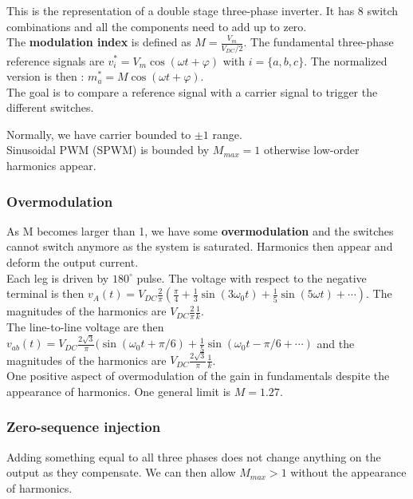 \documentclass[../main.tex]{subfiles}
\begin{document}
This is the representation of a double stage three-phase inverter. It has 8 switch combinations and all the components need to add up to zero.\\

The \textbf{modulation index} is defined as $M = \frac{V_m}{V_{DC}/2}$. The fundamental three-phase reference signals are $v_i^* = V_m \cos(\omega t + \varphi)$ with $i = \{a,b,c\}$. The normalized version is then : $m_a^* = M\cos(\omega t + \varphi)$.\\

The goal is to compare a reference signal with a carrier signal to trigger the different switches. 

Normally, we have carrier bounded to $\pm 1$ range. \\
Sinusoidal PWM (SPWM) is bounded by $M_{max} = 1$ otherwise low-order harmonics appear.\\

\subsubsection{Overmodulation}

As M becomes larger than 1, we have some \textbf{overmodulation} and the switches cannot switch anymore as the system is saturated. Harmonics then appear and deform the output current.\\

Each leg is driven by $180^\circ$ pulse. The voltage with respect to the negative terminal is then $v_A(t) = V_{DC} \frac{2}{\pi}(\frac{\pi}{4} + \frac{1}{3} \sin(3\omega_0 t) + \frac{1}{5} \sin(5\omega t) + \cdots )$. The magnitudes of the harmonics are $V_{DC} \frac{2}{\pi} \frac{1}{k}$.\\
The line-to-line voltage are then $v_{ab}(t) = V_{DC} \frac{2\sqrt{3}}{\pi} (\sin(\omega_0 t + \pi/6) + \frac{1}{5} \sin (\omega_0 t - \pi/6 + \cdots)$ and the magnitudes of the harmonics are $V_{DC} \frac{2\sqrt{3}}{\pi} \frac{1}{k}$.\\

One positive aspect of overmodulation of the gain in fundamentals despite the appearance of harmonics. One general limit is $M = 1.27$.\\

\subsubsection{Zero-sequence injection}
Adding something equal to all three phases does not change anything on the output as they compensate. We can then allow $M_{max}>1$ without the appearance of harmonics.\\
\end{document}
